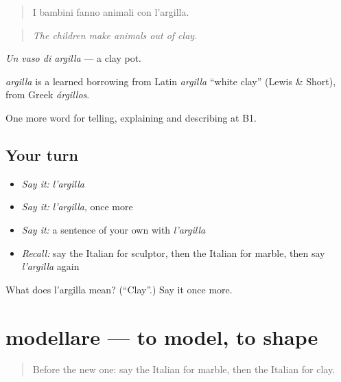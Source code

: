 \begin{quote}
I bambini fanno animali con l'argilla.
\end{quote}

\begin{quote}
\emph{The children make animals out of clay.}
\end{quote}

\emph{Un vaso di argilla} — a clay pot.

\begin{cousinweb}
\emph{argilla} is a learned borrowing from Latin \emph{argilla} \textquotedblleft{}white clay\textquotedblright{} (Lewis \& Short), from Greek \emph{árgillos}.
\end{cousinweb}

\begin{grammarlens}[title={What you've built}]
One more word for telling, explaining and describing at B1.
\end{grammarlens}

\subsection*{Your turn}
\begin{itemize}
\raggedright
  \item \emph{Say it:} \emph{l'argilla}
  \item \emph{Say it:} \emph{l'argilla}, once more
  \item \emph{Say it:} a sentence of your own with \emph{l'argilla}
  \item \emph{Recall:} say the Italian for sculptor, then the Italian for marble, then say \emph{l'argilla} again
\end{itemize}

\begin{tcolorbox}[breakable,colback=teal!4,colframe=teal!35!black,title={Before you move on}]
What does l'argilla mean? (\textquotedblleft{}Clay\textquotedblright{}.) Say it once more.
\end{tcolorbox}
\section[modellare]{modellare — to model, to shape}

\label{lesson:IT-C522-modellare}



\begin{quote}
Before the new one: say the Italian for marble, then the Italian for clay.
\end{quote}

